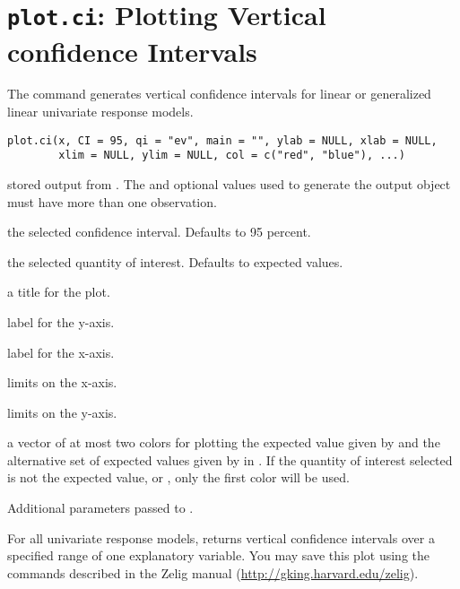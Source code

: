  \section{{\tt plot.ci}: Plotting Vertical confidence Intervals}\label{ss:plot.ci}
\begin{Description}\relax
The  command generates vertical
confidence intervals for linear or generalized linear univariate
response models.
\end{Description}
\begin{Usage}
\begin{verbatim}
plot.ci(x, CI = 95, qi = "ev", main = "", ylab = NULL, xlab = NULL,
        xlim = NULL, ylim = NULL, col = c("red", "blue"), ...) 
\end{verbatim}
\end{Usage}
\begin{Arguments}
\begin{ldescription}
\item[\code{x}] stored output from .  The  and optional
 values used to generate the  output object must
have more than one observation.
\item[\code{CI}] the selected confidence interval.  Defaults to 95
percent.
\item[\code{qi}] the selected quantity of interest.  Defaults to
expected values.
\item[\code{main}] a title for the plot.
\item[\code{ylab}] label for the y-axis.
\item[\code{xlab}] label for the x-axis.
\item[\code{xlim}] limits on the x-axis.
\item[\code{ylim}] limits on the y-axis.
\item[\code{col}] a vector of at most two colors for plotting the
expected value given by  and the alternative set of expected
values given by  in .  If the quantity of
interest selected is not the expected value, or ,
only the first color will be used.
\item[\code{...}] Additional parameters passed to .
\end{ldescription}
\end{Arguments}
\begin{Value}
For all univariate response models,  returns vertical
confidence intervals over a specified range of one explanatory
variable.  You may save this plot using the commands described in the
Zelig manual (\url{http://gking.harvard.edu/zelig}).
\end{Value}
